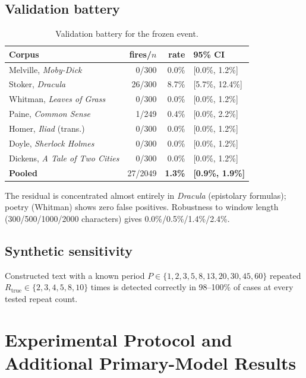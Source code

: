 \documentclass[11pt]{article}
\begin{document}
\subsection{Validation battery}
\begin{table}[ht]
\centering
\caption{Validation battery for the frozen event.}
\label{tab:validation}
\begin{tabular}{@{}lrrl@{}}
\toprule
Corpus & fires/$n$ & rate & 95\% CI \\
\midrule
Melville, \emph{Moby-Dick}      & 0/300  & 0.0\% & [0.0\%, 1.2\%] \\
Stoker, \emph{Dracula}          & 26/300 & 8.7\% & [5.7\%, 12.4\%] \\
Whitman, \emph{Leaves of Grass} & 0/300  & 0.0\% & [0.0\%, 1.2\%] \\
Paine, \emph{Common Sense}      & 1/249  & 0.4\% & [0.0\%, 2.2\%] \\
Homer, \emph{Iliad} (trans.)    & 0/300  & 0.0\% & [0.0\%, 1.2\%] \\
Doyle, \emph{Sherlock Holmes}   & 0/300  & 0.0\% & [0.0\%, 1.2\%] \\
Dickens, \emph{A Tale of Two Cities} & 0/300 & 0.0\% & [0.0\%, 1.2\%] \\
\midrule
\textbf{Pooled}                 & 27/2049 & \textbf{1.3\%} & \textbf{[0.9\%, 1.9\%]} \\
\bottomrule
\end{tabular}
\end{table}
The residual is concentrated almost entirely in \emph{Dracula} (epistolary formulas); poetry (Whitman) shows zero false positives. Robustness to window length (300/500/1000/2000 characters) gives 0.0\%/0.5\%/1.4\%/2.4\%.

\subsection{Synthetic sensitivity}
Constructed text with a known period $P\in\{1,\allowbreak2,\allowbreak3,\allowbreak5,\allowbreak8,\allowbreak13,\allowbreak20,\allowbreak30,\allowbreak45,\allowbreak60\}$ repeated $R_{\text{true}}\in\{2,\allowbreak3,\allowbreak4,\allowbreak5,\allowbreak8,\allowbreak10\}$ times is detected correctly in 98--100\% of cases at every tested repeat count.


\section{Experimental Protocol and Additional Primary-Model Results}
\label{sec:protocol}
\end{document}
